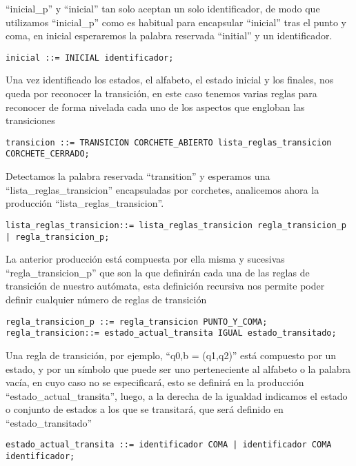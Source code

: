 \documentclass{llncs}
\begin{document}
“inicial\_p” y “inicial” tan solo aceptan un solo identificador, de modo que utilizamos “inicial\_p” como es habitual para encapsular “inicial” tras el punto y coma, en inicial esperaremos la palabra reservada “initial” y un identificador.

\begin{verbatim}
inicial ::= INICIAL identificador;
\end{verbatim} 

Una vez identificado los estados, el alfabeto, el estado inicial y los finales, nos queda por reconocer la transición, en este caso tenemos varias reglas para reconocer de forma nivelada cada uno de los aspectos que engloban las transiciones

\begin{verbatim}
transicion ::= TRANSICION CORCHETE_ABIERTO lista_reglas_transicion CORCHETE_CERRADO;
\end{verbatim} 

Detectamos la palabra reservada “transition” y esperamos una “lista\_reglas\_transicion” encapsuladas por corchetes,
analicemos ahora la producción “lista\_reglas\_transicion”.

\begin{verbatim}
lista_reglas_transicion::= lista_reglas_transicion regla_transicion_p | regla_transicion_p;
\end{verbatim} 

La anterior producción está compuesta por ella misma y sucesivas “regla\_transicion\_p” que son la que definirán cada una de las reglas de transición de nuestro autómata, esta definición recursiva nos permite poder definir cualquier número de reglas de transición

\begin{verbatim}
regla_transicion_p ::= regla_transicion PUNTO_Y_COMA;
regla_transicion::= estado_actual_transita IGUAL estado_transitado;
\end{verbatim} 

Una regla de transición, por ejemplo,  “q0,b = (q1,q2)” está compuesto por un estado, y por un símbolo que puede ser uno
perteneciente al alfabeto o la palabra vacía, en cuyo caso no se especificará, esto se definirá en la producción
“estado\_actual\_transita”, luego, a la derecha de la igualdad indicamos el estado o conjunto de estados a los que se
transitará, que será definido en “estado\_transitado”

\begin{verbatim}
estado_actual_transita ::= identificador COMA | identificador COMA identificador;
\end{verbatim} 
\end{document}
